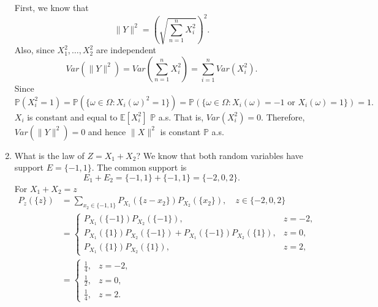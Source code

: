 \begin{exercise}[]
\begin{enumerate}[label=(\alph*)]
          First, we know that
          \[
          \|Y\|^2 = \left( \sqrt{\sum_{n=1}^{n} X_{i}^2 } \right)^2
          .\] 
          Also, since $X_1^2, \ldots, X_2^2 $ are independent
          \[
          Var(\|Y\|^2) = Var\left( \sum_{n=1}^{n} X_{i}^2  \right) = \sum_{i=1}^{n} Var(X_{i}^2)
          .\] 
          Since 
          \[
          \mathbb{P}(X_{i}^2=1) = \mathbb{P}(\{\omega \in \Omega: X_i(\omega)^2 = 1 \} )
          = \mathbb{P}(\{\omega \in \Omega: X_i(\omega) = -1 \text{ or } X_i(\omega) = 1\} ) = 1
          .\]
          $X_i $ is constant and equal to $\mathbb{E}[X_{i}^2] $ $\mathbb{P} $ a.s. That is, 
          $Var(X_{i}^2) = 0$. Therefore, $Var(\|Y\|^2) = 0$ and hence $\|X\|^2 $ is constant $\mathbb{P} $ a.s.
        \item
          What is the law of $Z = X_1 + X_2 $?
          We know that both random variables have support $E = \{-1,1\}  $. The common support is
          \[
          E_1+E_2 = \{-1,1\} + \{-1,1\} = \{-2, 0, 2\} 
          .\] 
          For $X_1 + X_2 = z $
          \begin{align*}
          P_z(\{z\} ) &= \sum_{x_2 \in \{-1,1\} }^{} P_{X_1}(\{z-x_2\})P_{X_2}(\{x_2\} ), \quad z \in \{-2,0,2\} \\
          &= \begin{cases}
            P_{X_1}(\{-1\} )P_{X_2}(\{-1\} ), & z = -2, \\
            P_{X_1}(\{1\} )P_{X_2}(\{-1\} ) + P_{X_1}(\{-1\} )P_{X_2}(\{1\} ), & z = 0, \\
            P_{X_1}(\{1\} )P_{X_2}(\{1\} ), & z = 2,
          \end{cases} \\
          &= \begin{cases}
            \frac{1}{4}, & z=-2,\\
            \frac{1}{2}, & z=0,\\
            \frac{1}{4}, & z=2.
          \end{cases} 
          \end{align*}
    \end{enumerate}
\end{exercise}

